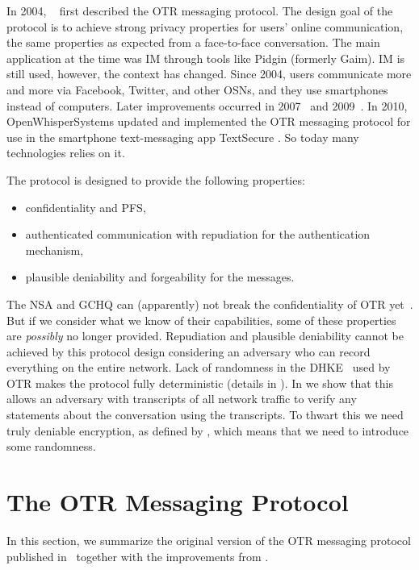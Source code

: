 In 2004, \citeauthor{otr2004}~\cite{otr2004} first described the \ac{OTR} 
messaging protocol.
The design goal of the protocol is to achieve strong privacy properties for 
users' online communication, the same properties as expected from 
a face-to-face conversation.
The main application at the time was \ac{IM} through tools like Pidgin 
\cite{pidgin} (formerly Gaim).
\ac{IM} is still used, however, the context has changed.
Since 2004, users communicate more and more via Facebook, Twitter, and other 
\acp{OSN}, and they use smartphones instead of computers.
Later improvements occurred in 2007~\cite{otr2007} and 2009~\cite{multiotr2009}.
In 2010, OpenWhisperSystems updated and implemented the \ac{OTR} messaging 
protocol for use in the smartphone text-messaging app TextSecure 
\cite{textsecure}.
So today many technologies relies on it.

The protocol is designed to provide the following properties:
\begin{itemize}
  \item confidentiality and \ac{PFS},
  \item authenticated communication with repudiation for the authentication 
    mechanism,
  \item plausible deniability and forgeability for the messages.
\end{itemize}
The \ac{NSA} and \ac{GCHQ} can (apparently) not break the confidentiality of 
\ac{OTR} yet~\cite{spiegelotr}.
But if we consider what we know of their capabilities, some of these properties 
are \emph{possibly} no longer provided.
Repudiation and plausible deniability cannot be achieved by this protocol 
design considering an adversary who can record everything on the entire 
network.
Lack of randomness in the \ac{DHKE}~\cite{dh} used by \ac{OTR} makes 
the protocol fully deterministic (details in ).
In  we show that this allows an adversary with 
transcripts of all network traffic to verify any statements about the 
conversation using the transcripts.
To thwart this we need truly deniable encryption, as defined by 
\citet{deniablecrypt}, which means that we need to introduce some randomness.


\section{The \acs{OTR} Messaging Protocol}
\label{sec:otr}

In this section, we summarize the original version of the \ac{OTR} messaging 
protocol published in~\cite{otr2004} together with the improvements from 
\cite{di2005secure}.

